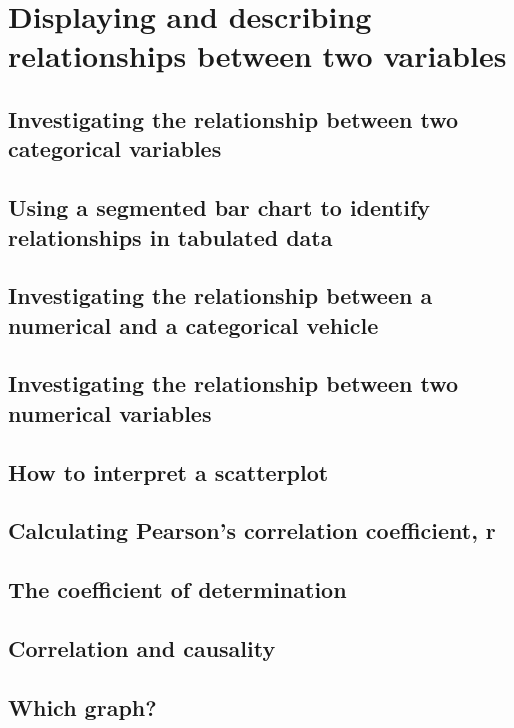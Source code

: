 \documentclass[a4paper,11pt]{article}
\begin{document}
\section{Displaying and describing relationships between two variables}
\begin{outline}

\0
\subsection{Investigating the relationship between two categorical variables}

\0
\subsection{Using a segmented bar chart to identify relationships in tabulated data}

\0
\subsection{Investigating the relationship between a numerical and a categorical vehicle}

\0
\subsection{Investigating the relationship between two numerical variables}

\0
\subsection{How to interpret a scatterplot}

\0
\subsection{Calculating Pearson's correlation coefficient, r}

\0
\subsection{The coefficient of determination}

\0
\subsection{Correlation and causality}

\0
\subsection{Which graph?}

\end{outline}
\end{document}
